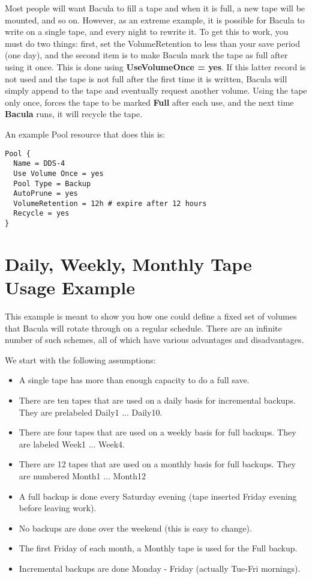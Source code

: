 Most people will want Bacula to fill a tape and when it is full, a new tape
will be mounted, and so on. However, as an extreme example, it is possible for
Bacula to write on a single tape, and every night to rewrite it. To get this
to work, you must do two things: first, set the VolumeRetention to less than
your save period (one day), and the second item is to make Bacula mark the
tape as full after using it once. This is done using {\bf UseVolumeOnce =
yes}. If this latter record is not used and the tape is not full after the
first time it is written, Bacula will simply append to the tape and eventually
request another volume. Using the tape only once, forces the tape to be marked
{\bf Full} after each use, and the next time {\bf Bacula} runs, it will
recycle the tape. 

An example Pool resource that does this is: 

\footnotesize
\begin{verbatim}
Pool {
  Name = DDS-4
  Use Volume Once = yes
  Pool Type = Backup
  AutoPrune = yes
  VolumeRetention = 12h # expire after 12 hours
  Recycle = yes
}
\end{verbatim}
\normalsize

\section{Daily, Weekly, Monthly Tape Usage Example}
\label{usageexample}

This example is meant to show you how one could define a fixed set of volumes
that Bacula will rotate through on a regular schedule. There are an infinite
number of such schemes, all of which have various advantages and
disadvantages. 

We start with the following assumptions: 

\begin{itemize}
\item A single tape has more than enough capacity to do  a full save.  
\item There are ten tapes that are used on a daily basis  for incremental
   backups. They are prelabeled Daily1 ...  Daily10.  
\item There are four tapes that are used on a weekly basis  for full backups.
   They are labeled Week1 ... Week4.  
\item There are 12 tapes that are used on a monthly basis  for full backups.
   They are numbered Month1 ... Month12  
\item A full backup is done every Saturday evening (tape inserted  Friday
   evening before leaving work).  
\item No backups are done over the weekend (this is easy to  change).  
\item The first Friday of each month, a Monthly tape is used for  the Full
   backup.  
\item Incremental backups are done Monday - Friday (actually  Tue-Fri
   mornings). 
   \end{itemize}

